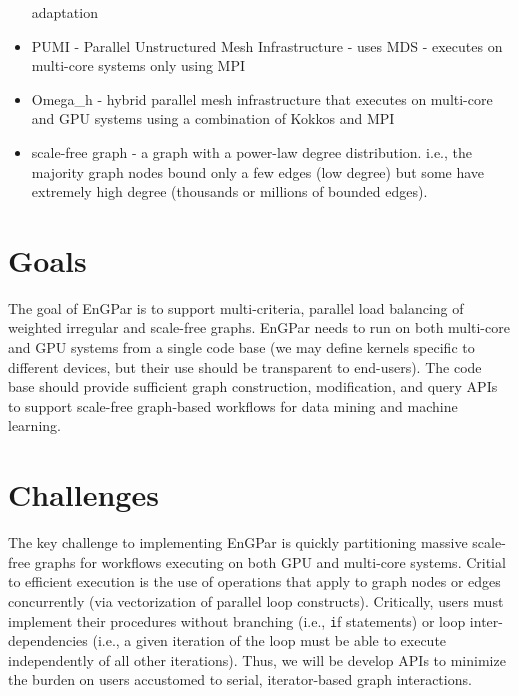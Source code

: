 \documentclass{article}
\begin{document}
\begin{itemize}
    adaptation~\cite{ibanez2017modifiable}
  \item PUMI - Parallel Unstructured Mesh Infrastructure - uses MDS - executes on
    multi-core systems only using MPI~\cite{ibanez2016pumi}
  \item Omega\_h - hybrid parallel mesh infrastructure that executes on
    multi-core and GPU systems using a combination of Kokkos and
    MPI~\cite{osh_github,ibanez2016mesh,ibanezthesis}
  \item scale-free graph - a graph with a power-law degree distribution. i.e.,
    the majority graph nodes bound only a few edges (low degree) but some have extremely high
    degree (thousands or millions of bounded edges).
\end{itemize}

\section{Goals}

The goal of EnGPar is to support multi-criteria, parallel
load balancing of weighted irregular and scale-free graphs.
EnGPar needs to run on both multi-core and GPU systems from a single code base
(we may define kernels specific to different devices, but their use should be
transparent to end-users).
The code base should provide sufficient graph construction, modification, and
query APIs to support scale-free graph-based workflows for data mining and
machine learning.

\section{Challenges}


The key challenge to implementing EnGPar is quickly partitioning massive
scale-free graphs for workflows executing on both GPU and multi-core systems.
Critial to efficient execution is the use of operations that apply to graph
nodes or edges concurrently (via vectorization of parallel loop constructs).
Critically, users must implement their procedures without branching (i.e.,
{\texttt if} statements) or loop inter-dependencies
(i.e., a given iteration of the loop must be able to execute independently of
all other iterations).
Thus, we will be develop APIs to minimize the burden on users accustomed to
serial, iterator-based graph interactions.
\end{document}
